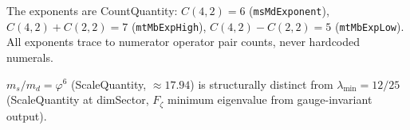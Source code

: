 The exponents are CountQuantity: $C(4,2) = 6$ (\texttt{msMdExponent}), $C(4,2)+C(2,2) = 7$ (\texttt{mtMbExpHigh}), $C(4,2)-C(2,2) = 5$ (\texttt{mtMbExpLow}). All exponents trace to numerator operator pair counts, never hardcoded numerals.

$m_s/m_d = \varphi^6$ (ScaleQuantity, $\approx 17.94$) is structurally distinct from $\lambda_{\min} = 12/25$ (ScaleQuantity at dimSector, $F_\zeta$ minimum eigenvalue from gauge-invariant output).

